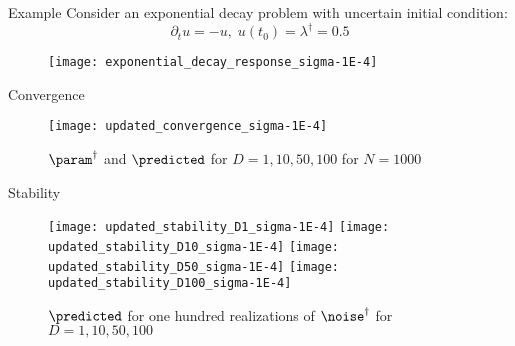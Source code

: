 \begin{block}{Example}
\centering
    Consider an exponential decay problem with uncertain initial condition:
    \begin{equation*}
        \partial_t u = - u, \; u(t_0) = \lambda^\dagger = 0.5
    \end{equation*}

    \begin{figure}
        \texttt{[image: exponential\_decay\_response\_sigma-1E-4]}
    \end{figure}

\end{block}


\begin{block}{Convergence}
\centering

    \begin{figure}
        \texttt{[image: updated\_convergence\_sigma-1E-4]}
        \caption*{\large $\param^\dagger$ and $\predicted$ for $D=1, 10, 50, 100$ for $N=1000$}
    \end{figure}

\end{block}

\vspace{-1cm}

\begin{block}{Stability}

    \begin{figure}
        \texttt{[image: updated\_stability\_D1\_sigma-1E-4]}
        \texttt{[image: updated\_stability\_D10\_sigma-1E-4]}
        \texttt{[image: updated\_stability\_D50\_sigma-1E-4]}
        \texttt{[image: updated\_stability\_D100\_sigma-1E-4]}
        \caption*{\large $\predicted$ for one hundred realizations of $\noise^\dagger$ for $D=1, 10, 50, 100$}
    \end{figure}

\end{block}

